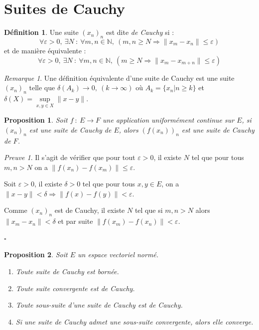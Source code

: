 \documentclass[]{article}
\newtheorem{myproposition}{Proposition}
\theoremstyle{remark}
\newtheorem{myrem}{Remarque}
\newtheorem{myproof}{Preuve}
\theoremstyle{definition}
\newtheorem{mydef}{Définition}
\newcommand{\cqfd}{
	\hfill$\square$
}
\newcommand{\funcshort}[3]{
#1 ~ : ~ #2 \longrightarrow #3
}
\begin{document}
\section{Suites de Cauchy}

\begin{mydef}
	Une suite $(x_n)_n$ est dite \textit{de Cauchy} si : $$\forall \varepsilon > 0, ~ \exists N ~ : ~ \forall m, n \in \mathbb{N}, ~(m, n \geqslant N \Longrightarrow \|x_m - x_n\| \leqslant \varepsilon)$$
	et de manière équivalente :
	$$\forall \varepsilon > 0, ~ \exists N ~ : ~ \forall m, n \in \mathbb{N}, ~(m \geqslant N \Longrightarrow \|x_m - x_{m+n}\| \leqslant \varepsilon)$$
\end{mydef}

\begin{myrem}
	Une définition équivalente d'une suite de Cauchy est une suite $(x_n)_n$ telle que $\delta(A_k) \longrightarrow 0, ~ (k \rightarrow \infty)$ où $A_k = \{x_n |n \geqslant k\}$ et $\delta (X) = \sup\limits_{x, y \in X} \|x - y\|$.
\end{myrem}

\begin{myproposition}
	Soit $\funcshort{f}{E}{F}$ une application uniformément continue sur $E$, si $(x_n)_n$ est une suite de Cauchy de $E$, alors $(f(x_n))_n$ est une suite de Cauchy de $F$.
\end{myproposition}

\begin{myproof}
	Il s'agit de vérifier que pour tout $\varepsilon > 0$, il existe $N$ tel que pour tous $m, n > N$ on a $\|f(x_n)-f(x_m)\| \leqslant \varepsilon$.
	
	Soit $\varepsilon > 0$, il existe $\delta > 0$ tel que pour tous $x, y \in E$, on a $\|x-y\| < \delta \Longrightarrow \|f(x)-f(y)\| < \varepsilon$.
	
	Comme $(x_n)_n$ est de Cauchy, il existe $N$ tel que si $m, n > N$ alors $\|x_m - x_n\| < \delta$ et par suite $\|f(x_m)-f(x_n)\| < \varepsilon$.
	
	\cqfd
\end{myproof}

\begin{myproposition}
	Soit $E$ un espace vectoriel normé.
	
	\begin{enumerate}
		\item Toute suite de Cauchy est bornée.
		\item Toute suite convergente est de Cauchy.
		\item Toute sous-suite d'une suite de Cauchy est de Cauchy.
		\item Si une suite de Cauchy admet une sous-suite convergente, alors elle converge.
	\end{enumerate}
\end{myproposition}
\end{document}
